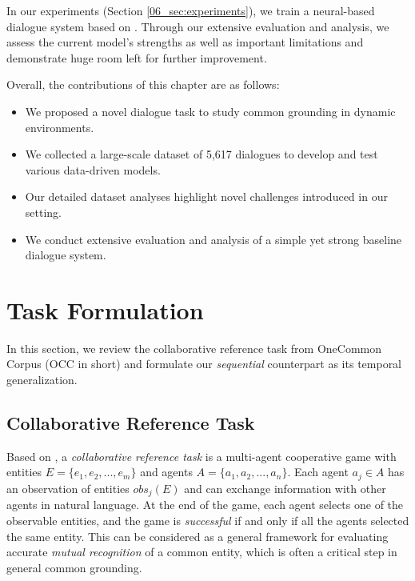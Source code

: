 In our experiments (Section \ref{06_sec:experiments}), we train a neural-based dialogue system based on \citet{udagawa2020annotated}. Through our extensive evaluation and analysis, we assess the current model's strengths as well as important limitations and demonstrate huge room left for further improvement.

Overall, the contributions of this chapter are as follows:

\begin{itemize}
    \item We proposed a novel dialogue task to study common grounding in dynamic environments.
    \item We collected a large-scale dataset of 5,617 dialogues to develop and test various data-driven models.
    \item Our detailed dataset analyses highlight novel challenges introduced in our setting.
    \item We conduct extensive evaluation and analysis of a simple yet strong baseline dialogue system.
\end{itemize}

\section{Task Formulation}
\label{06_sec:task_formulation}

In this section, we review the collaborative reference task from OneCommon Corpus (OCC in short) and formulate our \textit{sequential} counterpart as its temporal generalization.


\subsection{Collaborative Reference Task}
\label{06_subsec:collaborative_reference_task}

Based on \citet{udagawa2019natural}, a \textit{collaborative reference task} is a multi-agent cooperative game with entities $E = \{e_1, e_2, ... , e_m\}$ and agents $A = \{a_1, a_2, ... , a_n\}$. Each agent $a_j \in A$ has an observation of entities $obs_j(E)$ and can exchange information with other agents in natural language. At the end of the game, each agent selects one of the observable entities, and the game is \emph{successful} if and only if all the agents selected the same entity. This can be considered as a general framework for evaluating accurate \textit{mutual recognition} of a common entity, which is often a critical step in general common grounding.


